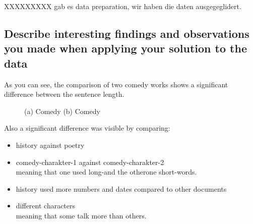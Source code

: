 \documentclass[runningheads]{llncs}
\begin{document}
XXXXXXXXX
gab es data preparation, wir haben die daten ausgegeglidert.


\subsection{Describe interesting findings and observations you made when applying your solution to the data}
As you can see, the comparison of two comedy works shows a significant difference between the sentence length.

\begin{figure}
    \centering
    \caption{(a) Comedy (b) Comedy}
    \label{fig:foobar}
\end{figure}

Also a significant difference was visible by comparing:
\begin{itemize}
    \item history against poetry
    \item comedy-charakter-1 against comedy-charakter-2 \\ meaning that one used long-and the otherone short-words.
    \item history used more numbers and dates compared to other documents
    \item different characters \\ meaning that some talk more than others.
\end{itemize}
\end{document}
